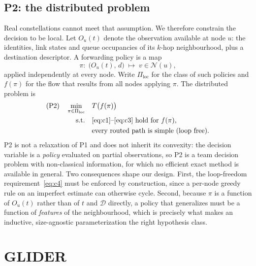 \documentclass[conference]{IEEEtran}
\begin{document}
\subsection{P2: the distributed problem}
Real constellations cannot meet that assumption. We therefore constrain the decision to be local. Let $O_u(t)$ denote the observation available at node $u$: the identities, link states and queue occupancies of its $k$-hop neighbourhood, plus a destination descriptor. A forwarding policy is a map
\begin{equation}
\pi:\;\big(O_u(t),\,d\big)\;\longmapsto\; v\in\mathcal{N}(u),
\label{eq:policy}
\end{equation}
applied independently at every node. Write $\Pi_{\mathrm{loc}}$ for the class of such policies and $f(\pi)$ for the flow that results from all nodes applying $\pi$. The distributed problem is
\begin{align}
(\mathrm{P2})\quad \min_{\pi\in\Pi_{\mathrm{loc}}}\quad & T\big(f(\pi)\big) \\
\text{s.t.}\quad & \text{\eqref{eq:c1}--\eqref{eq:c3} hold for } f(\pi), \\
& \text{every routed path is simple (loop free).} \label{eq:c4}
\end{align}
P2 is not a relaxation of P1 and does not inherit its convexity: the decision variable is a \emph{policy} evaluated on partial observations, so P2 is a team decision problem with non-classical information, for which no efficient exact method is available in general. Two consequences shape our design. First, the loop-freedom requirement~\eqref{eq:c4} must be enforced by construction, since a per-node greedy rule on an imperfect estimate can otherwise cycle. Second, because $\pi$ is a function of $O_u(t)$ rather than of $t$ and $\mathcal{D}$ directly, a policy that generalizes must be a function of \emph{features} of the neighbourhood, which is precisely what makes an inductive, size-agnostic parameterization the right hypothesis class.

\section{GLIDER}\label{sec:method}
\end{document}
